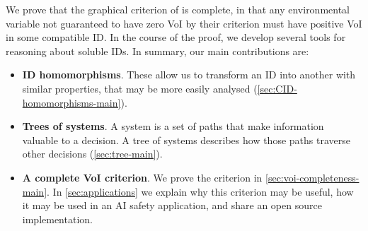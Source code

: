 We prove that the graphical criterion of \citet{nilsson2000evaluating} is complete,  in that any environmental variable not guaranteed to have zero VoI by their criterion must have positive VoI in some compatible ID.
In the course of the proof, we develop several tools for reasoning about soluble IDs.
In summary, our main contributions are:
\begin{itemize}
    \item \textbf{ID homomorphisms}. These allow us to transform an ID into another with similar properties, that may be more easily analysed (\cref{sec:CID-homomorphisms-main}).
    \item \textbf{Trees of systems}. A system is a set of paths that make information valuable to a decision.
    A tree of systems describes how those paths traverse other decisions (\cref{sec:tree-main}).
    \item \textbf{A complete VoI criterion}. We prove the criterion in \cref{sec:voi-completeness-main}. In \cref{sec:applications} we explain why this criterion may be useful, how it may be used in an AI safety application, and share an open source implementation.
\end{itemize}










































